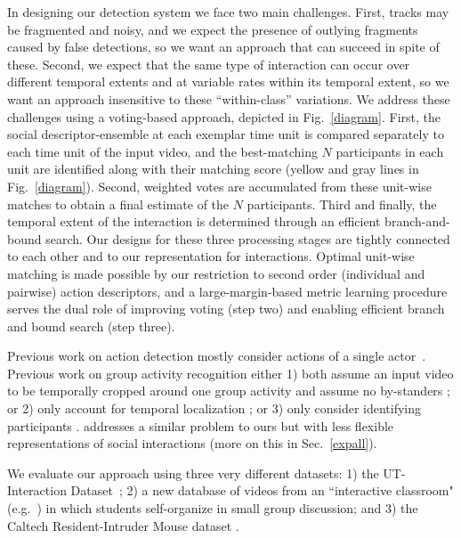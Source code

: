 In designing our detection system we face two main challenges. First, tracks may be fragmented and noisy, and we expect the presence of outlying fragments caused by false detections, so we want an approach that can succeed in spite of these. Second, we expect that the same type of interaction can occur over different temporal extents and at variable rates within its temporal extent, so we want an approach insensitive to these ``within-class'' variations. We address these challenges using a voting-based approach, depicted in Fig.~\ref{diagram}. First, the social descriptor-ensemble at each exemplar time unit is compared separately to each time unit of the input video, and the best-matching $N$ participants in each unit are identified along with their matching score (yellow and gray lines in Fig.~\ref{diagram}). Second, weighted votes are accumulated from these unit-wise matches to obtain a final estimate of the $N$ participants. Third and finally, the temporal extent of the interaction is determined through an efficient branch-and-bound search. Our designs for these three processing stages are tightly connected to each other and to our representation for interactions. Optimal unit-wise matching is made possible by our restriction to second order (individual and pairwise) action descriptors, and a large-margin-based metric learning procedure serves the dual role of improving voting (step two) and enabling efficient branch and bound search (step three).

Previous work on action detection mostly consider actions of a single actor~\cite{Ke:detection,Yuan:detection,Shechtman:detection,Hu:detection,Laptev:detection,Duchenne:detection}. Previous work on group activity recognition either 1) both assume an input video to be temporally cropped around one group activity and assume no by-standers \cite{Intille:act,Ni:group,Lan:Group}; or 2) only account for temporal localization \cite{Hongeng:act,Gong:act,Hakeem:act,McCowan:meeting,Choi:recogtrack,Vlad:group, Ryoo:group, CRIM13}; or 3) only consider identifying participants \cite{Li:segmentation,Cristani:discovery}. \cite{Amer:group} addresses a similar problem to ours but with less flexible representations of social interactions (more on this in Sec.~\ref{expall}). 

We evaluate our approach using three very different datasets: 1) the UT-Interaction Dataset~\cite{Ryoo:group}; 2) a new database of videos from an ``interactive classroom" (e.g.~\cite{Crouch:PI}) in which students self-organize in small group discussion; and 3) the Caltech Resident-Intruder Mouse dataset \cite{CRIM13}.



